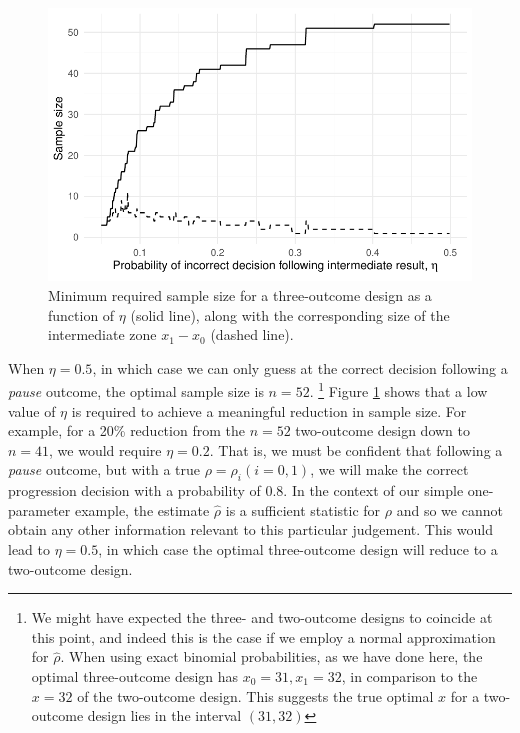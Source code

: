 \documentclass{bmcart}
\begin{document}
\begin{figure}
\centering
\includegraphics[scale=0.8]{./figures/eta_ns}
\caption{Minimum required sample size for a three-outcome design as a function of $\eta$ (solid line), along with the corresponding size of the intermediate zone $x_1 - x_0$ (dashed line).}
\label{fig:eta_ns}
\end{figure}

When $\eta = 0.5$, in which case we can only guess at the correct decision following a \emph{pause} outcome, the optimal sample size is $n = 52$. \footnote{We might have expected the three- and two-outcome designs to coincide at this point, and indeed this is the case if we employ a normal approximation for $\hat{\rho}$. When using exact binomial probabilities, as we have done here, the optimal three-outcome design has $x_0 = 31, x_1 = 32$, in comparison to the $x = 32$ of the two-outcome design. This suggests the true optimal $x$ for a two-outcome design lies in the interval $(31, 32)$} Figure \ref{fig:eta_ns} shows that a low value of $\eta$ is required to achieve a meaningful reduction in sample size. For example, for a 20\% reduction from the $n = 52$ two-outcome design down to $n = 41$, we would require $\eta = 0.2$. That is, we must be confident that following a \emph{pause} outcome, but with a true $\rho = \rho_i (i = 0,1)$, we will make the correct progression decision with a probability of 0.8. In the context of our simple one-parameter example, the estimate $\hat{\rho}$ is a sufficient statistic for $\rho$ and so we cannot obtain any other information relevant to this particular judgement. This would lead to $\eta = 0.5$, in which case the optimal three-outcome design will reduce to a two-outcome design.
\end{document}
